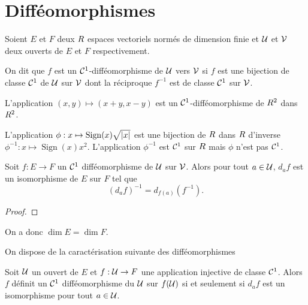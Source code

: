 \sld{\vfill\pagebreak[5]}%

\section{Difféomorphismes}

Soient $E$ et $F$ deux $R$ espaces vectoriels normés de dimension finie et $\mathcal{U}$ et $\mathcal{V}$ deux ouverts de $E$ et $F$ respectivement. %
\begin{definition}[(Difféomorphismes)]
 	On dit que $f$ est un $\mathcal{C}^1$-difféomorphisme de $\mathcal{U}$ vers $\mathcal{V}$ si $f$ est une bijection de classe $\mathcal{C}^1$ de $\mathcal{U}$ sur $\mathcal{V}$  dont la réciproque $f^{-1}$ est de classe $\mathcal{C}^1$ sur $\mathcal{V}$.
\end{definition}

\begin{exemple}
	L'application $(x,y) \mapsto (x+y,x-y)$ est un $\mathcal{C}^1$-difféomorphisme de $R^2$ dans $R^2$.
\end{exemple}
\begin{exemple}
	L'application $\phi: x\mapsto \operatorname{Sign}(x) \sqrt{\left\lvert x\right\rvert} $ est une bijection de $R$ dans $R$ d'inverse $\phi^{-1}: x \mapsto \operatorname{Sign}(x) x^2$. L'application $\phi^{-1}$ est $\mathcal{C}^1$ sur $R$ mais $\phi$ n'est pas $\mathcal{C}^1$.
	\pl{\rep{6cm}}
\end{exemple}

\sld{\vfill\pagebreak[5]}%
\begin{proposition}
	Soit $f:E\to F$ un $\mathcal{C}^1$ difféomorphisme de $\mathcal{U}$ sur $\mathcal{V}$. Alors pour tout $a\in \mathcal{U}$, $d_a f$ est un isomorphisme de $E$ sur $F$ tel que 
	\[
		(d_a f)^{-1} = d_{f(a)} (f^{-1}).
	\]
\end{proposition}

\begin{proof}
	\pl{\rep{3cm}}
\end{proof}

\begin{remark}
	On a donc $\dim E = \dim F $.
\end{remark}

On dispose de la caractérisation suivante des difféomorphismes
\begin{theorem}
	 Soit $\mathcal{U}$ un ouvert de $E$ et $f:\mathcal{U} \to F$ une application injective de classe $\mathcal{C}^1$. Alors $f$ définit un $\mathcal{C}^1$ difféomorphisme du $\mathcal{U}$ sur $f(\mathcal{U})$ si et seulement si $d_a f$ est un isomorphisme pour tout $a\in\mathcal{U}$.
\end{theorem}

